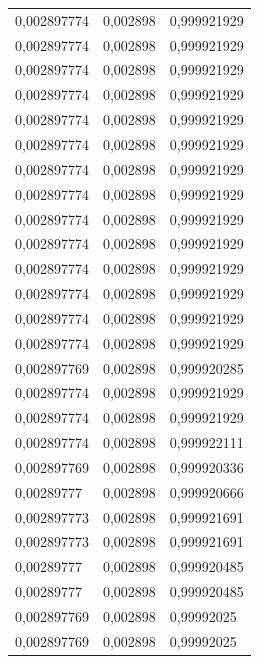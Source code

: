 \begin{center}
\begin{longtable}{|l|l|l|}
0,002897774        & 0,002898              & 0,999921929  \\
0,002897774        & 0,002898              & 0,999921929  \\
0,002897774        & 0,002898              & 0,999921929  \\
0,002897774        & 0,002898              & 0,999921929  \\
0,002897774        & 0,002898              & 0,999921929  \\
0,002897774        & 0,002898              & 0,999921929  \\
0,002897774        & 0,002898              & 0,999921929  \\
0,002897774        & 0,002898              & 0,999921929  \\
0,002897774        & 0,002898              & 0,999921929  \\
0,002897774        & 0,002898              & 0,999921929  \\
0,002897774        & 0,002898              & 0,999921929  \\
0,002897774        & 0,002898              & 0,999921929  \\
0,002897774        & 0,002898              & 0,999921929  \\
0,002897774        & 0,002898              & 0,999921929  \\
0,002897769        & 0,002898              & 0,999920285  \\
0,002897774        & 0,002898              & 0,999921929  \\
0,002897774        & 0,002898              & 0,999921929  \\
0,002897774        & 0,002898              & 0,999922111  \\
0,002897769        & 0,002898              & 0,999920336  \\
0,00289777         & 0,002898              & 0,999920666  \\
0,002897773        & 0,002898              & 0,999921691  \\
0,002897773        & 0,002898              & 0,999921691  \\
0,00289777         & 0,002898              & 0,999920485  \\
0,00289777         & 0,002898              & 0,999920485  \\
0,002897769        & 0,002898              & 0,99992025   \\
0,002897769        & 0,002898              & 0,99992025   \\

\end{longtable}
\end{center}
